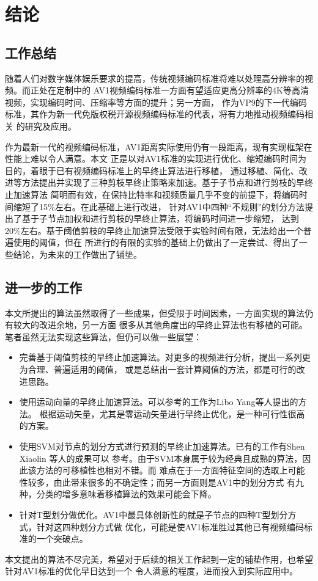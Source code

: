 \chapter{结论}
\label{cha:conclusion}

\section{工作总结}

随着人们对数字媒体娱乐要求的提高，传统视频编码标准将难以处理高分辨率的视频。而正处在定制中的
AV1视频编码标准一方面有望适应更高分辨率的4K等高清视频，实现编码时间、压缩率等方面的提升；另一方面，
作为VP9的下一代编码标准，其作为新一代免版权税开源视频编码标准的代表，将有力地推动视频编码相关
的研究及应用。

作为最新一代的视频编码标准，AV1距离实际使用仍有一段距离，现有实现框架在性能上难以令人满意。本文
正是以对AV1标准的实现进行优化、缩短编码时间为目的，着眼于已有视频编码标准上的早终止算法进行移植，
通过移植、简化、改进等方法提出并实现了三种剪枝早终止策略来加速。基于子节点和进行剪枝的早终止加速算法
简明而有效，在保持比特率和视频质量几乎不变的前提下，将编码时间缩短了15\%左右。在此基础上进行改进，
针对AV1中四种“不规则”的划分方法提出了基于子节点加权和进行剪枝的早终止算法，将编码时间进一步缩短，
达到20\%左右。基于阈值剪枝的早终止加速算法受限于实验时间有限，无法给出一个普遍使用的阈值，但在
所进行的有限的实验的基础上仍做出了一定尝试、得出了一些结论，为未来的工作做出了铺垫。

\section{进一步的工作}

本文所提出的算法虽然取得了一些成果，但受限于时间因素，一方面实现的算法仍有较大的改进余地，另一方面
很多从其他角度出的早终止算法也有移植的可能。笔者虽然无法实现这些算法，但仍可以做一些展望：

\begin{itemize}
    \item 完善基于阈值剪枝的早终止加速算法。对更多的视频进行分析，提出一系列更为合理、普遍适用的阈值，
    或是总结出一套计算阈值的方法，都是可行的改进思路。
    \item 使用运动向量的早终止加速算法。可以参考的工作为Libo Yang等人提出的方法\cite{yang2005effective}。
    根据运动矢量，尤其是零运动矢量进行早终止优化，是一种可行性很高的方案。
    \item 使用SVM对节点的划分方式进行预测的早终止加速算法。已有的工作有Shen Xiaolin 等人的成果可以
    参考\cite{shen2013cu}。由于SVM本身属于较为经典且成熟的算法，因此该方法的可移植性也相对不错。而
    难点在于一方面特征空间的选取上可能性较多，由此带来很多的不确定性；而另一方面则是AV1中的划分方式
    有九种，分类的增多意味着移植算法的效果可能会下降。
    \item 针对T型划分做优化。AV1中最具体创新性的就是子节点的四种T型划分方式，针对这四种划分方式做
    优化，可能是使AV1标准胜过其他已有视频编码标准的一个突破点。
\end{itemize}

本文提出的算法不尽完美，希望对于后续的相关工作起到一定的铺垫作用，也希望针对AV1标准的优化早日达到一个
令人满意的程度，进而投入到实际应用中。